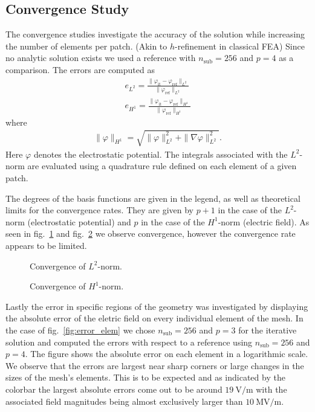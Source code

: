 \subsection{Convergence Study}
The convergence studies investigate the accuracy of the solution while increasing the number of elements per patch. (Akin to $h$-refinement in classical FEA) Since no analytic solution exists we used a reference with $n_\mathrm{sub}=256$ and $p=4$ as a comparison.
The errors are computed as
\begin{align}
  e_{L^2} = \frac{\| \varphi_\mathrm{it} - \varphi_\mathrm{ref} \|_{L^2}}{\| \varphi_\mathrm{ref} \|_{L^2}}\\
  e_{H^1} = \frac{\| \varphi_\mathrm{it} - \varphi_\mathrm{ref} \|_{H^1}}{\| \varphi_\mathrm{ref} \|_{H^1}}
\end{align}
where
\begin{align}
  \| \varphi \|_{H^1} = \sqrt{ \| \varphi \|_{L^2}^2 + \| \nabla\varphi \|_{L^2}^2 }.
\end{align}
Here $\varphi$ denotes the electrostatic potential. The integrals associated with the $L^2$-norm are evaluated using a quadrature rule defined on each element of a given patch.

The degrees of the basis functions are given in the legend, as well as theoretical limits for the convergence rates. They are given by $p+1$ in the case of the $L^2$-norm (electrostatic potential) and $p$ in the case of the $H^1$-norm (electric field). As seen in fig.~\ref{fig:convergence_potential} and fig.~\ref{fig:convergence_gradient} we observe convergence, however the convergence rate appears to be limited.

\begin{figure}[H]
  \begin{center}
    
    \caption{Convergence of $L^2$-norm.}
    \label{fig:convergence_potential}
  \end{center}
\end{figure}

\begin{figure}[H]
  \begin{center}
    
    \caption{Convergence of $H^1$-norm.}
    \label{fig:convergence_gradient}
  \end{center}
\end{figure}

Lastly the error in specific regions of the geometry was investigated by displaying the absolute error of the eletric field on every individual element of the mesh. In the case of fig.~\ref{fig:error_elem} we chose $n_\mathrm{sub}=256$ and $p=3$ for the iterative solution and computed the errors with respect to a reference using $n_\mathrm{sub}=256$ and $p=4$.
The figure shows the absolute error on each element in a logarithmic scale. We observe that the errors are largest near sharp corners or large changes in the sizes of the mesh's elements. This is to be expected and as indicated by the colorbar the largest absolute errors come out to be around $19\ \mathrm{V/m}$ with the associated field magnitudes being almost exclusively larger than $10\ \mathrm{MV/m}$.


